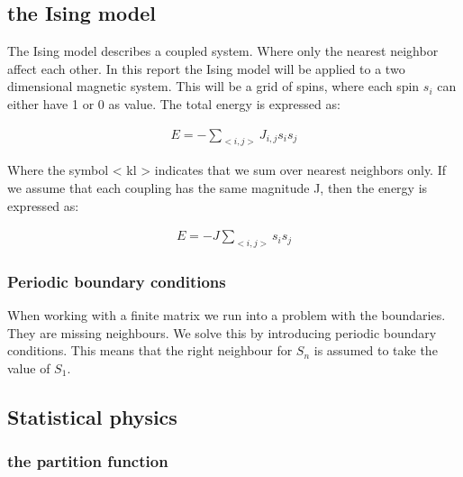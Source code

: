
\subsection{the Ising model}

The Ising model describes a coupled system. Where only the nearest neighbor affect each other. In this report the Ising model will be applied to a two dimensional magnetic system. This will be a grid of spins, where each spin $s_i$ can either have 1 or 0 as value. The total energy is expressed as:


\begin{align*}
	E = - \sum_{<i,j>} J_{i,j} s_i s_j
\end{align*}

Where the symbol < kl > indicates that we sum over nearest neighbors only.
If we assume that each coupling has the same magnitude J, then the energy is expressed as:

\begin{align}
	E = - J \sum_{<i,j>} s_i s_j
	\label{eq:ising-energy}
\end{align}

\subsubsection{Periodic boundary conditions}

When working with a finite matrix we run into a problem with the boundaries. They are missing neighbours. We solve this by introducing periodic boundary conditions. This means that the right neighbour for $S_n$ is assumed to take the value of $S_1$.





















\subsection{Statistical physics}

\subsubsection{the partition function}\label{sec:z-func}

